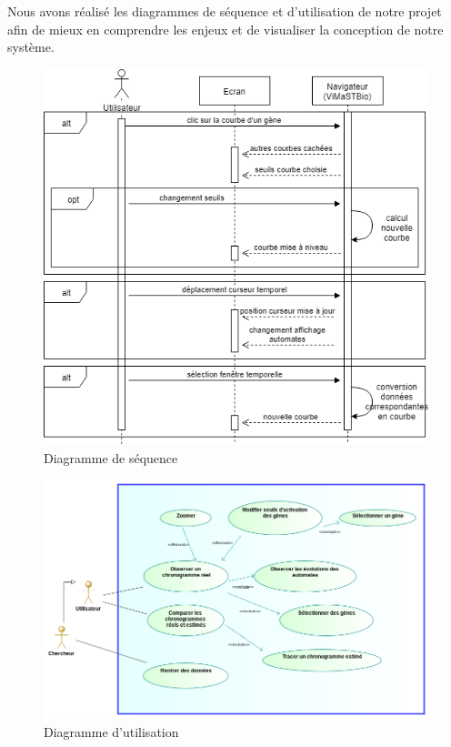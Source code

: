 Nous avons réalisé les diagrammes de séquence et d'utilisation de notre projet afin de mieux en comprendre les enjeux et de visualiser la conception de notre système.
\bigbreak
\bigbreak
\bigbreak

\begin{figure}[!h]
\bigbreak
\bigbreak
   \centering
    \includegraphics[scale = .6]{images/sequence.png}
   \caption{Diagramme de séquence}
\end{figure}
\bigbreak
\bigbreak
\bigbreak
\bigbreak
\begin{figure}[!h]
    \center
    \includegraphics[scale = .45]{images/utilisation.png}
   \caption{Diagramme d'utilisation}
\end{figure}


